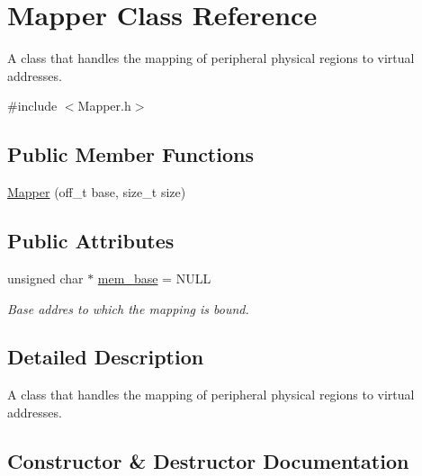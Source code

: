 \hypertarget{classMapper}{}\section{Mapper Class Reference}
\label{classMapper}


A class that handles the mapping of peripheral physical regions to virtual addresses.  




{\ttfamily \#include $<$Mapper.\+h$>$}

\subsection*{Public Member Functions}
\begin{DoxyCompactItemize}
\item 
\mbox{\hyperlink{classMapper_ad94bc5276f51985b51f72922f64bc19e}{Mapper}} (off\+\_\+t base, size\+\_\+t size)
\end{DoxyCompactItemize}
\subsection*{Public Attributes}
\begin{DoxyCompactItemize}
\item 
\mbox{\label{classMapper_afadadee19eb92436827f4f1e8c71a4e6}} 
unsigned char $\ast$ \mbox{\hyperlink{classMapper_afadadee19eb92436827f4f1e8c71a4e6}{mem\+\_\+base}} = N\+U\+LL
\begin{DoxyCompactList}\small\item\em Base addres to which the mapping is bound. \end{DoxyCompactList}\end{DoxyCompactItemize}


\subsection{Detailed Description}
A class that handles the mapping of peripheral physical regions to virtual addresses. 

\subsection{Constructor \& Destructor Documentation}
\mbox{\label{classMapper_ad94bc5276f51985b51f72922f64bc19e}} 
